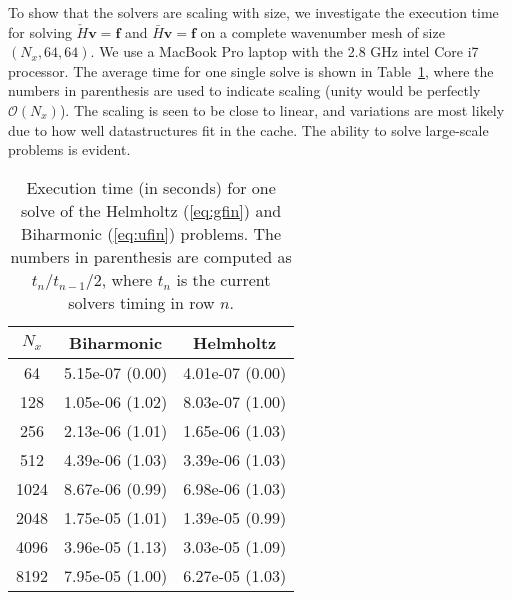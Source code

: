 \documentclass[preprint]{elsarticle}
\newcommand{\N}[1]{\check{#1}}
\newcommand{\D}[1]{\bar{#1}}
\begin{document}
To show that the solvers are scaling with size, we investigate the execution time 
for solving $\N{H} \bm{v} = \bm{f}$ and $\D{H} \bm{v} = \bm{f}$ on a complete 
wavenumber mesh of size $(N_x,64,64)$. We use a MacBook Pro laptop with the 2.8 GHz intel Core i7 processor. The average time for one single solve is shown in Table~\ref{tab:timings}, where the numbers in parenthesis are used to indicate scaling (unity would be perfectly $\mathcal{O}(N_x)$). The scaling is seen to be close to linear, and variations 
are most likely due to how well datastructures fit in the cache. The ability to solve large-scale problems is evident.
\begin{table}
	\centering
	\caption{Execution time (in seconds) for one solve  of the Helmholtz 
	(\ref{eq:gfin}) and Biharmonic 
	(\ref{eq:ufin}) problems. The numbers in parenthesis are computed as $t_n / t_{n-1} / 2$, where $t_n$ is the current solvers timing in row $n$. 	\label{tab:timings}}
	\begin{tabular}{ccc}
$N_x$ & Biharmonic & Helmholtz \\ 
\hline
64 & 5.15e-07 (0.00) & 4.01e-07 (0.00) \\ 
128 & 1.05e-06 (1.02) & 8.03e-07 (1.00) \\ 
256 & 2.13e-06 (1.01) & 1.65e-06 (1.03) \\ 
512 & 4.39e-06 (1.03) & 3.39e-06 (1.03) \\ 
1024 & 8.67e-06 (0.99) & 6.98e-06 (1.03) \\ 
2048 & 1.75e-05 (1.01) & 1.39e-05 (0.99) \\ 
4096 & 3.96e-05 (1.13) & 3.03e-05 (1.09) \\ 
8192 & 7.95e-05 (1.00) & 6.27e-05 (1.03) \\
	\end{tabular}
\end{table}
\end{document}
